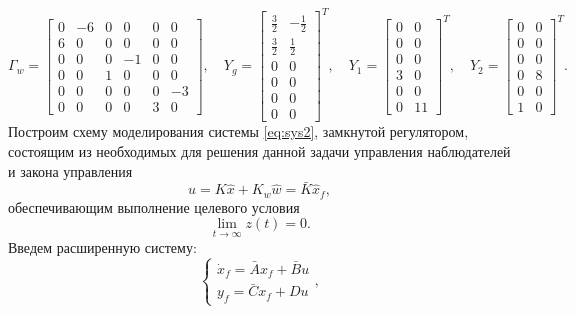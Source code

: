 \begin{equation*}
    \Gamma_w=\begin{bmatrix}
        0 & -6 & 0 & 0 & 0 & 0\\
        6 & 0 & 0 & 0 & 0 & 0\\
        0 & 0 & 0 & -1 & 0 & 0\\
        0 & 0 & 1 & 0 & 0 & 0\\
        0 & 0 & 0 & 0 & 0 & -3\\
        0 & 0 & 0 & 0 & 3 & 0
    \end{bmatrix},\quad
    Y_g=\begin{bmatrix}
        \frac{3}{2} & -\frac{1}{2}\\
        \frac{3}{2} & \frac{1}{2}\\
        0 & 0\\
        0 & 0\\
        0 & 0\\
        0 & 0
        \end{bmatrix}^T,\quad
        Y_1=\begin{bmatrix}
        0 & 0\\
        0 & 0\\
        0 & 0\\
        3 & 0\\
        0 & 0\\
        0 & 11
        \end{bmatrix}^T,\quad
        Y_2=\begin{bmatrix}
        0 & 0\\
        0 & 0\\
        0 & 0\\
        0 & 8\\
        0 & 0\\
        1 & 0
        \end{bmatrix}^T.
\end{equation*}
Построим схему моделирования системы \eqref{eq:sys2}, замкнутой регулятором, состоящим
из необходимых для решения данной задачи управления наблюдателей и закона
управления
\begin{equation}
    \label{eq:reg}
    u=K\hat x+K_w\hat w=\bar K\hat x_f,
\end{equation}
обеспечивающим выполнение целевого условия
\begin{equation}
    \label{eq:aim}
    \lim_{t\rightarrow\infty}z(t)=0.
\end{equation}
Введем расширенную систему:
\begin{equation*}
    \begin{cases}
        \dot x_f=\bar Ax_f+\bar Bu\\
        y_f=\bar Cx_f+Du
    \end{cases},
\end{equation*}
